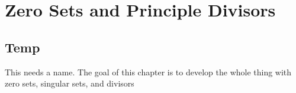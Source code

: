 \chapter{Zero Sets and Principle Divisors}\label{ch:ZeroDiv}

\section{Temp}%
\label{sec:temp1}

This needs a name. The goal of this chapter is to develop the whole thing with
zero sets, singular sets, and divisors
